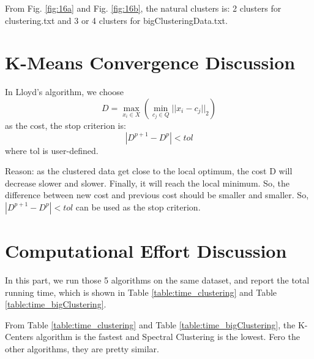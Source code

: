 From Fig. \ref{fig:16a} and Fig. \ref{fig:16b}, the natural clusters is: 2 clusters for clustering.txt and 3 or 4 clusters for bigClusteringData.txt.\\

\section{\Large K-Means Convergence Discussion}

In Lloyd's algorithm, we choose 
    $$D = \underset{x_i \in X}{\max}( \underset{c_j \in Q}{\min}{||x_i - c_j||_2})$$
as the cost, the stop criterion is: 
    $$|D^{p+1} - D^{p}| < tol$$
where tol is user-defined.

Reason: as the clustered data get close to the local optimum, the cost D will decrease slower and slower. Finally, it will reach the local minimum. So, the difference between new cost and previous cost should be smaller and smaller. So, $|D^{p+1} - D^{p}| < tol$ can be used as the stop criterion.\\


\section{\Large Computational Effort Discussion}

In this part, we run those 5 algorithms on the same dataset, and report the total running time, which is shown in Table \ref{table:time_clustering} and Table \ref{table:time_bigClustering}.

From Table \ref{table:time_clustering} and Table \ref{table:time_bigClustering}, the K-Centers algorithm is the fastest and Spectral Clustering is the lowest. Fero the other algorithms, they are pretty similar.

